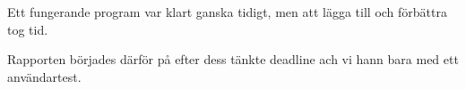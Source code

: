 Ett fungerande program var klart ganska tidigt,
men att lägga till och förbättra tog tid.

Rapporten börjades därför på efter dess tänkte deadline
ach vi hann bara med ett användartest.

